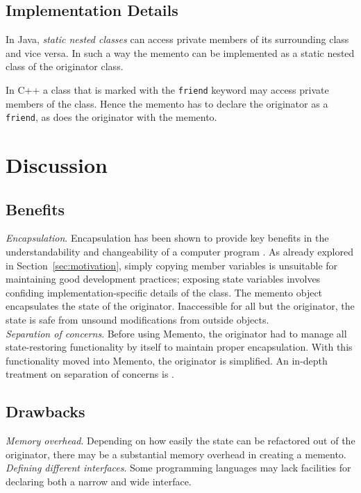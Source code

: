 \documentclass[11pt, a4paper, twoside]{article}
\begin{document}
	\subsection{Implementation Details}
	\label{sec:impl}
	In Java, \emph{static nested classes} can access private members of its surrounding class and vice versa. In such a way the memento can be implemented as a static nested class of the originator class.
	
	In C++ a class that is marked with the \verb|friend| keyword may access private members of the class. Hence the memento has to declare the originator as a \verb|friend|, as does the originator with the memento.
	
	\section{Discussion}
	
	\subsection{Benefits}
	\label{sec:benefits}
	\emph{Encapsulation}. Encapsulation has been shown to provide key benefits in the understandability and changeability of a computer program \cite{snyder1986}. As already explored in Section~\ref{sec:motivation}, simply copying member variables is unsuitable for maintaining good development practices; exposing state variables involves confiding implementation-specific details of the class. The memento object encapsulates the state of the originator. Inaccessible for all but the originator, the state is safe from unsound modifications from outside objects. \\
	
	\noindent\emph{Separation of concerns}. Before using Memento, the originator had to manage all state-restoring functionality by itself to maintain proper encapsulation. With this functionality moved into Memento, the originator is simplified. An in-depth treatment on separation of concerns is \cite{Huersch95}.
	
	\subsection{Drawbacks}
	\emph{Memory overhead}. Depending on how easily the state can be refactored out of the originator, there may be a substantial memory overhead in creating a memento. \\
	
	\noindent\emph{Defining different interfaces}. Some programming languages may lack facilities for declaring both a narrow and wide interface. \\
	
\end{document}
